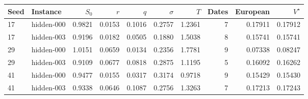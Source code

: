 \begin{tabular}{ll rrrrrr r r}
\toprule
Seed & Instance & $S_0$ & $r$ & $q$ & $\sigma$ & $T$ & Dates & European & $V^\star$ \\
\midrule
17 & hidden-000 & 0.9821 & 0.0153 & 0.1016 & 0.2757 & 1.2361 & 7 & 0.17911 & 0.17912 \\
17 & hidden-003 & 0.9196 & 0.0182 & 0.0505 & 0.1880 & 1.5038 & 8 & 0.15741 & 0.15741 \\
29 & hidden-000 & 1.0151 & 0.0659 & 0.0134 & 0.2356 & 1.7781 & 9 & 0.07338 & 0.08247 \\
29 & hidden-003 & 0.9109 & 0.0677 & 0.0818 & 0.2875 & 1.1195 & 5 & 0.16092 & 0.16262 \\
41 & hidden-000 & 0.9477 & 0.0155 & 0.0317 & 0.3174 & 0.9718 & 9 & 0.15429 & 0.15430 \\
41 & hidden-003 & 0.9338 & 0.0646 & 0.1087 & 0.2756 & 1.3263 & 7 & 0.17213 & 0.17243 \\
\bottomrule
\end{tabular}
